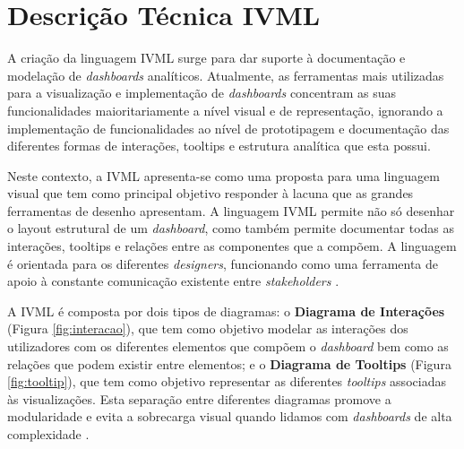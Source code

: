\section{Descrição Técnica IVML} %
\label{sec:esp_ivml}

A criação da linguagem \gls{IVML} surge para dar suporte à documentação e modelação de \textit{dashboards} analíticos. Atualmente, as ferramentas mais utilizadas para a visualização e implementação de \textit{dashboards} concentram as suas funcionalidades maioritariamente a nível visual e de representação, ignorando a implementação de funcionalidades ao nível de prototipagem e documentação das diferentes formas de interações, tooltips e estrutura analítica que esta possui.

Neste contexto, a \gls{IVML} apresenta-se como uma proposta para uma linguagem visual que tem como principal objetivo responder à lacuna que as grandes ferramentas de desenho apresentam. A linguagem \gls{IVML} permite não só desenhar o layout estrutural de um \textit{dashboard}, como também permite documentar todas as interações, tooltips e relações entre as componentes que a compõem. A linguagem é orientada para os diferentes \textit{designers}, funcionando como uma ferramenta de apoio à constante comunicação existente entre \textit{stakeholders} \cite{Ferreira2023IVML}. 

A \gls{IVML} é composta por dois tipos de diagramas: o \textbf{Diagrama de Interações} (Figura \ref{fig:interacao}), que tem como objetivo modelar as interações dos utilizadores com os diferentes elementos que compõem o \textit{dashboard} bem como as relações que podem existir entre elementos; e o \textbf{Diagrama de Tooltips} (Figura \ref{fig:tooltip}), que tem como objetivo representar as diferentes \textit{tooltips} associadas às visualizações. Esta separação entre diferentes diagramas promove a modularidade e evita a sobrecarga visual quando lidamos com \textit{dashboards} de alta complexidade \cite{Ferreira2023IVML}.




